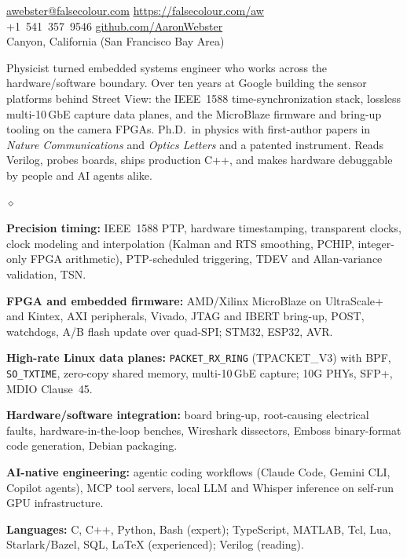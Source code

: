 \documentclass{webster-resume}
\newlength{\secgap}\setlength{\secgap}{0.32cm}
\newcommand{\seclabel}[1]{\llap{{\small\bfseries #1}\hskip\secgap}}
\newcommand{\secsp}{\par\addvspace{0.75em plus 0.2em}}
\newcommand{\rsection}[1]{\secsp\noindent\seclabel{#1}\ignorespaces}
\newcommand{\lsection}[1]{\seclabel{#1}$\diamond$}
\newenvironment{list3}{
  \begin{list}{$\diamond$}{%
      \setlength{\itemsep}{-0.05in}
      \setlength{\parsep}{.05in} \setlength{\parskip}{0in}
      \setlength{\topsep}{0in} \setlength{\partopsep}{0in}
      \setlength{\leftmargin}{0.2in}}}{\end{list}}
\begin{document}

\href{mailto:awebster@falsecolour.com}{awebster@falsecolour.com}
\hfill\href{https://falsecolour.com/aw}{https://falsecolour.com/aw}\\
+1~541~357~9546
\hfill\href{https://github.com/AaronWebster}{github.com/AaronWebster}\\
Canyon, California (San Francisco Bay Area)

\rsection{Summary}
Physicist turned embedded systems engineer who works across the
hardware/software boundary.  Over ten years at Google building the sensor
platforms behind Street View: the IEEE~1588 time-synchronization stack,
lossless multi-10\,GbE capture data planes, and the MicroBlaze firmware and
bring-up tooling on the camera FPGAs.  Ph.D.\ in physics with first-author
papers in \emph{Nature Communications} and \emph{Optics Letters} and a
patented instrument.  Reads Verilog, probes boards, ships production C++,
and makes hardware debuggable by people and AI agents alike.

\secsp
\begin{list3}
\item[\lsection{Strengths}] {\bf Precision timing:} IEEE~1588 PTP, hardware
  timestamping, transparent clocks, clock modeling and interpolation (Kalman
  and RTS smoothing, PCHIP, integer-only FPGA arithmetic), PTP-scheduled
  triggering, TDEV and Allan-variance validation, TSN.
\item {\bf FPGA and embedded firmware:} AMD/Xilinx MicroBlaze on UltraScale+
  and Kintex, AXI peripherals, Vivado, JTAG and IBERT bring-up, POST,
  watchdogs, A/B flash update over quad-SPI; STM32, ESP32, AVR.
\item {\bf High-rate Linux data planes:} \texttt{PACKET\_RX\_RING}
  (TPACKET\_V3) with BPF, \texttt{SO\_TXTIME}, zero-copy shared memory,
  multi-10\,GbE capture; 10G PHYs, SFP+, MDIO Clause~45.
\item {\bf Hardware/software integration:} board bring-up, root-causing
  electrical faults, hardware-in-the-loop benches, Wireshark dissectors,
  Emboss binary-format code generation, Debian packaging.
\item {\bf AI-native engineering:} agentic coding workflows (Claude Code,
  Gemini CLI, Copilot agents), MCP tool servers, local LLM and Whisper
  inference on self-run GPU infrastructure.
\item {\bf Languages:} C, C++, Python, Bash (expert); TypeScript, MATLAB,
  Tcl, Lua, Starlark/Bazel, SQL, \LaTeX{} (experienced); Verilog (reading).
\end{list3}
\end{document}
